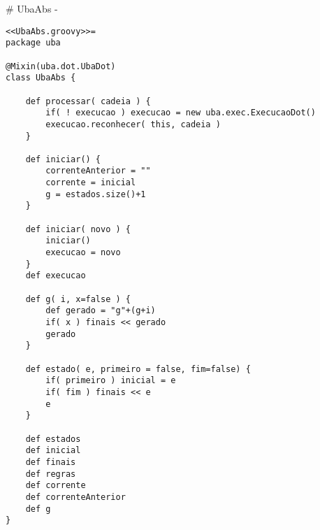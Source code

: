 # UbaAbs {-}

\begin{lstlisting}[style=java]
<<UbaAbs.groovy>>=
package uba

@Mixin(uba.dot.UbaDot)
class UbaAbs {

    def processar( cadeia ) {
        if( ! execucao ) execucao = new uba.exec.ExecucaoDot()
        execucao.reconhecer( this, cadeia )
    }

    def iniciar() {
        correnteAnterior = ""
        corrente = inicial
        g = estados.size()+1
    }

    def iniciar( novo ) {
        iniciar()
        execucao = novo
    }
    def execucao

    def g( i, x=false ) {
        def gerado = "g"+(g+i)
        if( x ) finais << gerado
        gerado
    }

    def estado( e, primeiro = false, fim=false) {
        if( primeiro ) inicial = e
        if( fim ) finais << e
        e
    }

    def estados
    def inicial
    def finais
    def regras
    def corrente
    def correnteAnterior
    def g
}




\end{lstlisting}
